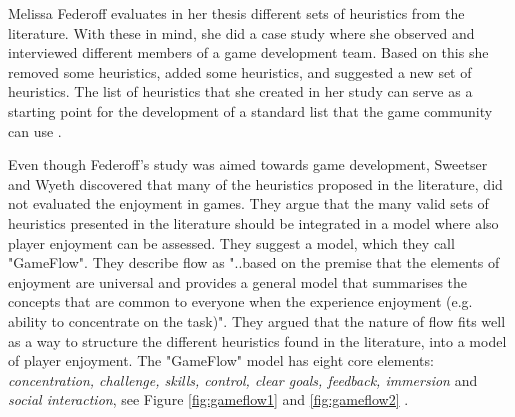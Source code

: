 Melissa Federoff evaluates in her thesis different sets of heuristics from the literature. With these in mind, she did a case study where she observed and interviewed different members of a game development team. Based on this she removed some heuristics, added some heuristics, and  suggested a new set of heuristics. The list of heuristics that she created in her study can serve as a starting point for the development of a standard list that the game community can use  \cite{federoff}. 

Even though Federoff's study was aimed towards game development, Sweetser and Wyeth discovered that many of the heuristics proposed in the literature, did not evaluated the enjoyment in games. They argue that the many valid sets of heuristics presented in the literature should be integrated in a model where also player enjoyment can be assessed. They suggest a model, which they call "GameFlow". They describe flow as "..based on the premise that the elements of enjoyment are universal and provides a general model that summarises the concepts that are common to everyone when the experience enjoyment (e.g. ability to concentrate on the task)". They argued that the nature of flow fits well as a way to structure the different heuristics found in the literature, into a model of player enjoyment. The "GameFlow" model has eight core elements: \emph{concentration, challenge, skills, control, clear goals, feedback, immersion} and \emph{social interaction}, see Figure \ref{fig:gameflow1} and \ref{fig:gameflow2} \cite{sweetser}. 

